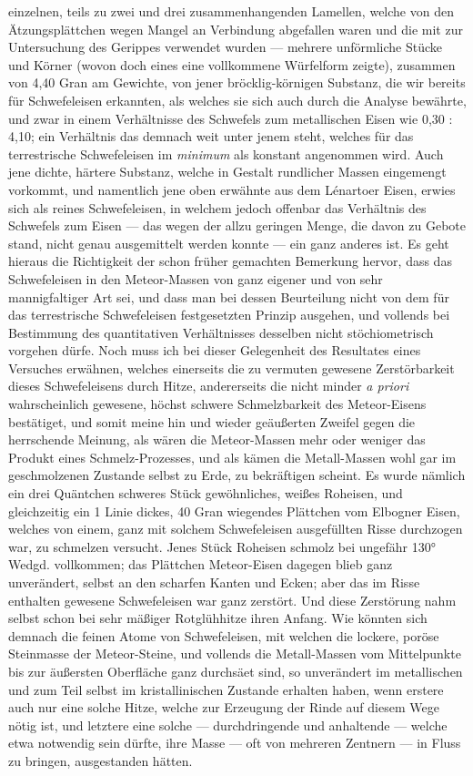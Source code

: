 \documentclass[a4paper, 11pt, oneside, german]{article}
\begin{document}
einzelnen, teils zu zwei und drei zusammenhangenden Lamellen, welche von den Ätzungsplättchen wegen Mangel an Verbindung abgefallen waren und die mit zur Untersuchung des Gerippes verwendet wurden --- mehrere unförmliche Stücke und Körner (wovon doch eines eine vollkommene Würfelform zeigte), zusammen von 4,40 Gran am Gewichte, von jener bröcklig-körnigen Substanz, die wir bereits für Schwefeleisen erkannten, als welches sie sich auch durch die Analyse bewährte, und zwar in einem Verhältnisse des Schwefels zum metallischen Eisen wie 0,30 : 4,10; ein Verhältnis das demnach weit unter jenem steht, welches für das terrestrische Schwefeleisen im \emph{minimum} als konstant angenommen wird. Auch jene dichte, härtere Substanz, welche in Gestalt rundlicher Massen eingemengt vorkommt, und namentlich jene oben erwähnte aus dem Lénartoer Eisen, erwies sich als reines Schwefeleisen, in welchem jedoch offenbar das Verhältnis des Schwefels zum Eisen --- das wegen der allzu geringen Menge, die davon zu Gebote stand, nicht genau ausgemittelt werden konnte --- ein ganz anderes ist. Es geht hieraus die Richtigkeit der schon früher gemachten Bemerkung hervor, dass das Schwefeleisen in den Meteor-Massen von ganz eigener und von sehr mannigfaltiger Art sei, und dass man bei dessen Beurteilung nicht von dem für das terrestrische Schwefeleisen festgesetzten Prinzip ausgehen, und vollends bei Bestimmung des quantitativen Verhältnisses desselben nicht stöchiometrisch vorgehen dürfe.  
Noch muss ich bei dieser Gelegenheit des Resultates eines Versuches erwähnen, welches einerseits die zu vermuten gewesene Zerstörbarkeit dieses Schwefeleisens durch Hitze, andererseits die nicht minder \emph{a priori} wahrscheinlich gewesene, höchst schwere Schmelzbarkeit des Meteor-Eisens bestätiget, und somit meine hin und wieder geäußerten Zweifel gegen die herrschende Meinung, als wären die Meteor-Massen mehr oder weniger das Produkt eines Schmelz-Prozesses, und als kämen die Metall-Massen wohl gar im geschmolzenen Zustande selbst zu Erde, zu bekräftigen scheint. Es wurde nämlich ein drei Quäntchen schweres Stück gewöhnliches, weißes Roheisen, und gleichzeitig ein 1 Linie dickes, 40 Gran wiegendes Plättchen vom Elbogner Eisen, welches von einem, ganz mit solchem Schwefeleisen ausgefüllten Risse durchzogen war, zu schmelzen versucht. Jenes Stück Roheisen schmolz bei ungefähr 130° Wedgd. vollkommen; das Plättchen Meteor-Eisen dagegen blieb ganz unverändert, selbst an den scharfen Kanten und Ecken; aber das im Risse enthalten gewesene Schwefeleisen war ganz zerstört. Und diese Zerstörung nahm selbst schon bei sehr mäßiger Rotglühhitze ihren Anfang. Wie könnten sich demnach die feinen Atome von Schwefeleisen, mit welchen die lockere, poröse Steinmasse der Meteor-Steine, und vollends die Metall-Massen vom Mittelpunkte bis zur äußersten Oberfläche ganz durchsäet sind, so unverändert im metallischen und zum Teil selbst im kristallinischen Zustande erhalten haben, wenn erstere auch nur eine solche Hitze, welche zur Erzeugung der Rinde auf diesem Wege nötig ist, und letztere eine solche --- durchdringende und anhaltende --- welche etwa notwendig sein dürfte, ihre Masse --- oft von mehreren Zentnern --- in Fluss zu bringen, ausgestanden hätten.
\end{document}
